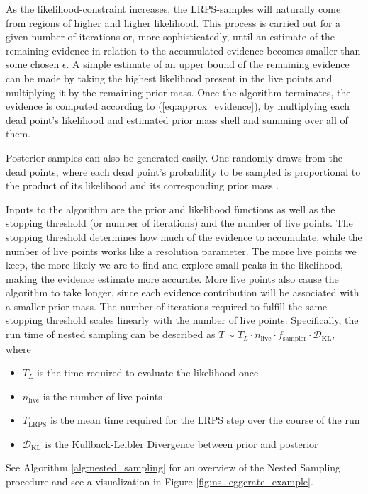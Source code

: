 \documentclass[12pt, a4paper]{report}
\begin{document}
As the likelihood-constraint increases, the LRPS-samples will naturally come from regions of higher and higher likelihood.
This process is carried out for a given number of iterations or, more sophisticatedly, until an estimate of the remaining evidence in relation to the accumulated evidence becomes smaller than some chosen $\epsilon$.
A simple estimate of an upper bound of the remaining evidence can be made by taking the highest likelihood present in the live points and multiplying it by the remaining prior mass.
Once the algorithm terminates, the evidence is computed according to (\ref{eq:approx_evidence}), by multiplying each dead point's likelihood and estimated prior mass shell and summing over all of them.

Posterior samples can also be generated easily.
One randomly draws from the dead points, where each dead point's probability to be sampled is proportional to the product of its likelihood and its corresponding prior mass \cite[9]{nested_sampling_talk}.

Inputs to the algorithm are the prior and likelihood functions as well as the stopping threshold (or number of iterations) and the number of live points.
The stopping threshold determines how much of the evidence to accumulate, while the number of live points works like a resolution parameter.
The more live points we keep, the more likely we are to find and explore small peaks in the likelihood, making the evidence estimate more accurate.
More live points also cause the algorithm to take longer, since each evidence contribution will be associated with a smaller prior mass.
The number of iterations required to fulfill the same stopping threshold scales linearly with the number of live points.
Specifically, the run time of nested sampling can be described as $T \sim T_L \cdot n_{\textrm{live}} \cdot f_{\textrm{sampler}} \cdot \mathcal{D}_{\textrm{KL}}$, where
\begin{itemize}
    \item $T_L$ is the time required to evaluate the likelihood once
    \item $n_{\textrm{live}}$ is the number of live points
    \item $T_{\textrm{LRPS}}$ is the mean time required for the LRPS step over the course of the run
    \item $\mathcal{D}_{\textrm{KL}}$ is the Kullback-Leibler Divergence \cite[6]{kld} between prior and posterior \cite[1]{nested_sampling_talk}
\end{itemize}
See Algorithm \ref{alg:nested_sampling} for an overview of the Nested Sampling procedure and see a visualization in Figure \ref{fig:ns_eggcrate_example}.
\end{document}
